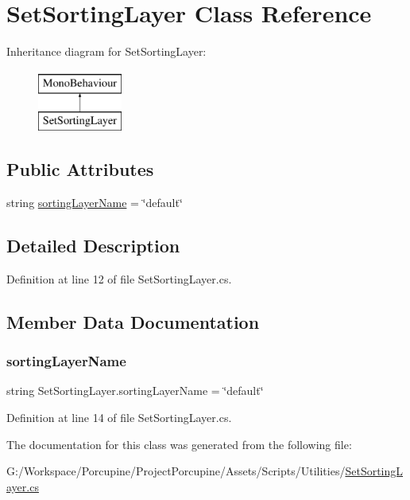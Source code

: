 \hypertarget{class_set_sorting_layer}{}\section{Set\+Sorting\+Layer Class Reference}
\label{class_set_sorting_layer}
Inheritance diagram for Set\+Sorting\+Layer\+:\begin{figure}[H]
\begin{center}
\leavevmode
\includegraphics[height=2.000000cm]{class_set_sorting_layer}
\end{center}
\end{figure}
\subsection*{Public Attributes}
\begin{DoxyCompactItemize}
\item 
string \hyperlink{class_set_sorting_layer_a249533d1d88e667caf018ccb57e75e37}{sorting\+Layer\+Name} = \char`\"{}default\char`\"{}
\end{DoxyCompactItemize}


\subsection{Detailed Description}


Definition at line 12 of file Set\+Sorting\+Layer.\+cs.



\subsection{Member Data Documentation}
\mbox{\label{class_set_sorting_layer_a249533d1d88e667caf018ccb57e75e37}} 
\subsubsection{\texorpdfstring{sorting\+Layer\+Name}{sortingLayerName}}
{\footnotesize\ttfamily string Set\+Sorting\+Layer.\+sorting\+Layer\+Name = \char`\"{}default\char`\"{}}



Definition at line 14 of file Set\+Sorting\+Layer.\+cs.



The documentation for this class was generated from the following file\+:\begin{DoxyCompactItemize}
\item 
G\+:/\+Workspace/\+Porcupine/\+Project\+Porcupine/\+Assets/\+Scripts/\+Utilities/\hyperlink{_set_sorting_layer_8cs}{Set\+Sorting\+Layer.\+cs}\end{DoxyCompactItemize}
